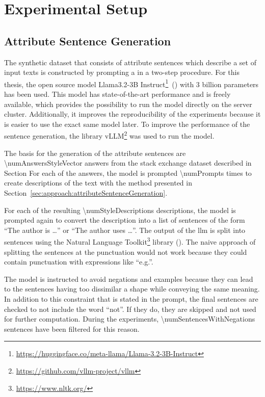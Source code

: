 
\section{Experimental Setup}
\label{sec:experiments:setup}


\subsection{Attribute Sentence Generation}
\label{sec:experiments:setup:sentenceGeneration}
The synthetic dataset that consists of attribute sentences which describe a set of input texts is constructed by prompting a  in a two-step procedure. For this thesis, the open source model Llama3.2-3B Instruct\footnote{\url{https://huggingface.co/meta-llama/Llama-3.2-3B-Instruct}}~(\cite{dubeyLlama3Herd2024}) with \num{3} billion parameters has been used. This model has state-of-the-art performance and is freely available, which provides the possibility to run the model directly on the server cluster. Additionally, it improves the reproducibility of the experiments because it is easier to use the exact same model later.
To improve the performance of the sentence generation, the library vLLM\footnote{\url{https://github.com/vllm-project/vllm}} was used to run the model.

The basis for the generation of the attribute sentences are \num{\numAnswersStyleVector} answers from the stack exchange dataset described in Section %
For each of the answers, the model is prompted \num{\numPrompts} times to create descriptions of the text with the method presented in Section~\ref{sec:approach:attributeSentenceGeneration}.

For each of the resulting \num{\numStyleDescriptions} descriptions, the model is prompted again to convert the description into a list of sentences of the form \enquote{The author is \ldots} or \enquote{The author uses \ldots}. The output of the \ac{llm} is split into sentences using the Natural Language Toolkit\footnote{\url{https://www.nltk.org/}} library (\cite{birdNaturalLanguageProcessing2009}). The naive approach of splitting the sentences at the punctuation would not work because they could contain punctuation with expressions like \enquote{e.g.}.

The model is instructed to avoid negations and examples because they can lead to the sentences having too dissimilar a shape while conveying the same meaning. In addition to this constraint that is stated in the prompt, the final sentences are checked to not include the word \enquote{not}. If they do, they are skipped and not used for further computation. During the experiments, \num{\numSentencesWithNegations} sentences have been filtered for this reason.

